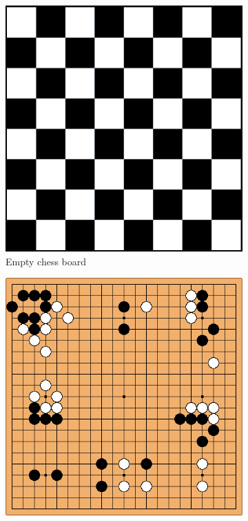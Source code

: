 \documentclass[12pt]{report}
\begin{document}
\begin{figure}[h]
	\centering
	\begin{subfigure}[b]{0.4\linewidth}
		\centering
		\includegraphics[width=\textwidth]{images/chessboard}
		\caption{Empty chess board} 
	\end{subfigure}
	\hfill
	\begin{subfigure}[b]{0.4\linewidth}
		\centering
		\includegraphics[width=\textwidth]{images/goboard}

\end{subfigure}
\end{figure}
\end{document}
